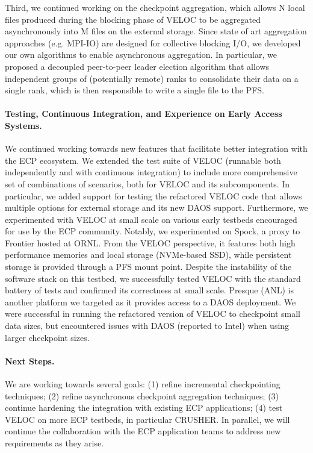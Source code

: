 Third, we continued working on the checkpoint aggregation, which allows
N local files produced during the blocking phase of VELOC to be aggregated
asynchronously into M files on the external storage. Since state of
art aggregation approaches (e.g. MPI-IO) are designed for collective
blocking I/O, we developed our own algorithms to enable asynchronous
aggregation. In particular, we proposed a decoupled peer-to-peer
leader election algorithm that allows independent groups of (potentially
remote) ranks to consolidate their data on a single rank, which is then
responsible to write a single file to the PFS.

\paragraph{Testing, Continuous Integration, and Experience on Early Access Systems.}
We continued working towards new features that facilitate better
integration with the ECP ecosystem. We extended the test suite of
VELOC (runnable both independently and with continuous integration) to
include more comprehensive set of combinations of scenarios, both for
VELOC and its subcomponents. In particular, we added support for
testing the refactored VELOC code that allows multiple options for
external storage and its new DAOS support. Furthermore, we
experimented with VELOC at small scale on various early testbeds
encouraged for use by the ECP community. Notably, we experimented on
Spock, a proxy to Frontier hosted at ORNL. From the VELOC perspective,
it features both high performance memories and local storage
(NVMe-based SSD), while persistent storage is provided through a PFS
mount point. Despite the instability of the software stack on this
testbed, we successfully tested VELOC with the standard battery of
tests and confirmed its correctness at small scale. Presque (ANL) is
another platform we targeted as it provides access to a DAOS
deployment. We were successful in running the refactored version of
VELOC to checkpoint small data sizes, but encountered issues with DAOS
(reported to Intel) when using larger checkpoint sizes.

\paragraph{Next Steps.}
We are working towards several goals: (1) refine incremental
checkpointing techniques; (2) refine asynchronous checkpoint
aggregation techniques; (3) continue hardening the integration with
existing ECP applications; (4) test VELOC on more ECP testbeds, in
particular CRUSHER. In parallel, we will continue the collaboration
with the ECP application teams to address new requirements as they
arise.
